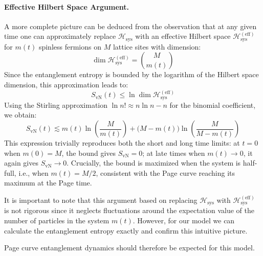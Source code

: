 \documentclass[12pt,oneside,openright]{report}
\theoremstyle{definition}
\theoremstyle{plain}
\theoremstyle{remark}
\begin{document}
\paragraph{Effective Hilbert Space Argument.}
A more complete picture can be deduced from the observation that at any given time one can approximately replace 
$\mathcal{H}_\mathrm{sys}$ with an effective Hilbert space $\mathcal{H}_\mathrm{sys}^{(\mathrm{eff})}$ for $m(t)$ 
spinless fermions on $M$ lattice sites with dimension:
\begin{equation}
  \dim \mathcal{H}_\mathrm{sys}^{(\mathrm{eff})} = \binom{M}{m(t)}
\end{equation}
Since the entanglement entropy is bounded by the logarithm of the Hilbert space dimension, this approximation leads to:
\begin{equation}
  S_{\mathrm{vN}}(t) \leq \ln \dim \mathcal{H}_\mathrm{sys}^{(\mathrm{eff})}
\end{equation}
Using the Stirling approximation $\ln n! \approx n \ln n - n$ for the binomial coefficient, we obtain:
\begin{equation}\label{eq:Sent_Heff}
  S_{\mathrm{vN}}(t) \lesssim m(t) \ln\left(\frac{M}{m(t)}\right) + \bigl(M - m(t)\bigr) \ln\left(\frac{M}{M - m(t)}\right)
\end{equation}
This expression trivially reproduces both the short and long time limits: at $t=0$ when $m(0)=M$, the bound 
gives $S_{\mathrm{vN}}=0$; at late times when $m(t)\to 0$, it again gives $S_{\mathrm{vN}}\to 0$. Crucially, the 
bound is maximized when the system is half-full, i.e., when $m(t) = M/2$, consistent with the Page curve 
reaching its maximum at the Page time.

It is important to note that this argument based on replacing $\mathcal{H}_\mathrm{sys}$ with 
$\mathcal{H}_\mathrm{sys}^{(\mathrm{eff})}$ is not rigorous since it neglects fluctuations around the 
expectation value of the number of particles in the system $m(t)$. However, for our model we can
calculate the entanglement entropy exactly and confirm this intuitive picture.

Page curve entanglement dynamics should therefore be expected for this model.
\end{document}
